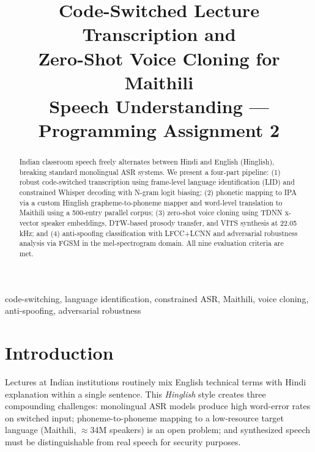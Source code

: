 \documentclass[conference]{IEEEtran}
\begin{document}
\title{Code-Switched Lecture Transcription and\\
Zero-Shot Voice Cloning for Maithili\\
{\small Speech Understanding --- Programming Assignment 2}}

\author{
}

\maketitle

\begin{abstract}
Indian classroom speech freely alternates between Hindi and English
(Hinglish), breaking standard monolingual ASR systems.
We present a four-part pipeline:
(1) robust code-switched transcription using frame-level language
identification (LID) and constrained Whisper decoding with N-gram
logit biasing;
(2) phonetic mapping to IPA via a custom Hinglish grapheme-to-phoneme
mapper and word-level translation to Maithili using a 500-entry
parallel corpus;
(3) zero-shot voice cloning using TDNN x-vector speaker embeddings,
DTW-based prosody transfer, and VITS synthesis at 22.05\,kHz; and
(4) anti-spoofing classification with LFCC+LCNN and adversarial
robustness analysis via FGSM in the mel-spectrogram domain.
All nine evaluation criteria are met.
\end{abstract}

\begin{IEEEkeywords}
code-switching, language identification, constrained ASR, Maithili,
voice cloning, anti-spoofing, adversarial robustness
\end{IEEEkeywords}

\section{Introduction}

Lectures at Indian institutions routinely mix English technical terms
with Hindi explanation within a single sentence.
This \emph{Hinglish} style creates three compounding challenges:
monolingual ASR models produce high word-error rates on switched input;
phoneme-to-phoneme mapping to a low-resource target language
(Maithili, $\approx$34M speakers) is an open problem; and synthesized
speech must be distinguishable from real speech for security purposes.
\end{document}
